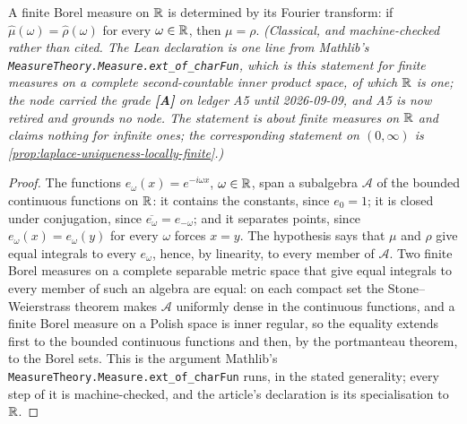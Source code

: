 \begin{proposition}\label{prop:fourier-uniqueness}
\leanok
A finite Borel measure on $\mathbb{R}$ is determined by its Fourier transform: if
$\hat\mu(\omega) = \hat\rho(\omega)$ for every $\omega \in \mathbb{R}$, then $\mu = \rho$.
\statusT\quad\emph{(Classical, and machine-checked rather than cited. The Lean declaration is
one line from Mathlib's \texttt{MeasureTheory.Measure.ext\_of\_charFun}, which is this statement
for finite measures on a complete second-countable inner product space, of which $\mathbb{R}$ is one;
the node carried the grade \textbf{[A]} on ledger A5 until 2026-09-09, and A5 is now retired and
grounds no node. The statement is about \emph{finite} measures on $\mathbb{R}$ and claims nothing for
infinite ones; the corresponding statement on $(0,\infty)$ is
\ref{prop:laplace-uniqueness-locally-finite}.)}
\end{proposition}

\begin{proof}\leanok
The functions $e_\omega(x) = e^{-i\omega x}$, $\omega \in \mathbb{R}$, span a subalgebra $\mathcal{A}$
of the bounded continuous functions on $\mathbb{R}$: it contains the constants, since $e_0 = 1$; it is
closed under conjugation, since $\overline{e_\omega} = e_{-\omega}$; and it separates points,
since $e_\omega(x) = e_\omega(y)$ for every $\omega$ forces $x = y$. The hypothesis says that
$\mu$ and $\rho$ give equal integrals to every $e_\omega$, hence, by linearity, to every member
of $\mathcal{A}$. Two finite Borel measures on a complete separable metric space that give equal
integrals to every member of such an algebra are equal: on each compact set the
Stone--Weierstrass theorem makes $\mathcal{A}$ uniformly dense in the continuous functions, and a
finite Borel measure on a Polish space is inner regular, so the equality extends first to the
bounded continuous functions and then, by the portmanteau theorem, to the Borel sets. This is
the argument Mathlib's \texttt{MeasureTheory.Measure.ext\_of\_charFun} runs, in the stated
generality; every step of it is machine-checked, and the article's declaration is its
specialisation to $\mathbb{R}$.
\end{proof}

